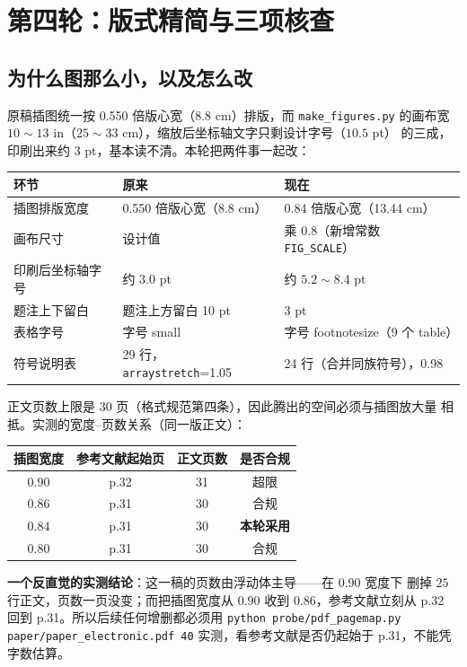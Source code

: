\documentclass[11pt,a4paper]{ctexart}
\newcommand{\src}[1]{\texttt{#1}}
\begin{document}
\section{第四轮：版式精简与三项核查}

\subsection{为什么图那么小，以及怎么改}

原稿插图统一按 0.550 倍版心宽（$8.8$ cm）排版，而 \src{make\_figures.py}
的画布宽 $10\sim13$ in（$25\sim33$ cm），缩放后坐标轴文字只剩设计字号（$10.5$ pt）
的三成，印刷出来约 $3$ pt，基本读不清。本轮把两件事一起改：

\begin{center}
\begin{tabular}{lll}
\toprule
环节 & 原来 & 现在 \\
\midrule
插图排版宽度 & 0.550 倍版心宽（8.8 cm） & 0.84 倍版心宽（13.44 cm） \\
画布尺寸 & 设计值 & 乘 0.8（新增常数 \src{FIG\_SCALE}） \\
印刷后坐标轴字号 & 约 $3.0$ pt & 约 $5.2\sim8.4$ pt \\
题注上下留白 & 题注上方留白 10 pt & 3 pt \\
表格字号 & 字号 small & 字号 footnotesize（9 个 table） \\
符号说明表 & 29 行，\src{arraystretch}=1.05 & 24 行（合并同族符号），0.98 \\
\bottomrule
\end{tabular}
\end{center}

\noindent 正文页数上限是 $30$ 页（格式规范第四条），因此腾出的空间必须与插图放大量
相抵。实测的宽度--页数关系（同一版正文）：

\begin{center}
\begin{tabular}{cccc}
\toprule
插图宽度 & 参考文献起始页 & 正文页数 & 是否合规 \\
\midrule
$0.90$ & p.32 & 31 & 超限 \\
$0.86$ & p.31 & 30 & 合规 \\
$0.84$ & p.31 & 30 & \textbf{本轮采用} \\
$0.80$ & p.31 & 30 & 合规 \\
\bottomrule
\end{tabular}
\end{center}

\noindent\textbf{一个反直觉的实测结论}：这一稿的页数由浮动体主导——在 $0.90$ 宽度下
删掉 $25$ 行正文，页数一页没变；而把插图宽度从 $0.90$ 收到 $0.86$，参考文献立刻从
p.32 回到 p.31。所以后续任何增删都必须用
\texttt{python probe/pdf\_pagemap.py paper/paper\_electronic.pdf 40}
实测，看参考文献是否仍起始于 p.31，不能凭字数估算。
\end{document}
